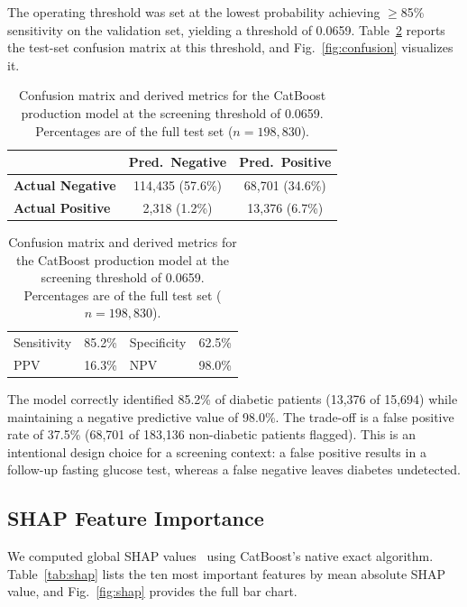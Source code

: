 The operating threshold was set at the lowest probability achieving $\geq$85\% sensitivity on the validation set, yielding a threshold of 0.0659. Table~\ref{tab:confusion} reports the test-set confusion matrix at this threshold, and Fig.~\ref{fig:confusion} visualizes it.

\begin{table}[ht]
\centering
\caption{Confusion matrix and derived metrics for the CatBoost production model at the screening threshold of 0.0659. Percentages are of the full test set ($n = 198{,}830$).}
\label{tab:confusion}
\begin{tabular}{lcc}
\hline
 & \textbf{Pred.\ Negative} & \textbf{Pred.\ Positive} \\
\hline
\textbf{Actual Negative} & 114,435 (57.6\%) & 68,701 (34.6\%) \\
\textbf{Actual Positive} & 2,318 (1.2\%)    & 13,376 (6.7\%)  \\
\hline
\end{tabular}
\vspace{4pt}

\begin{tabular}{lclc}
\hline
Sensitivity & 85.2\% & Specificity & 62.5\% \\
PPV         & 16.3\% & NPV         & 98.0\% \\
\hline
\end{tabular}
\end{table}

The model correctly identified 85.2\% of diabetic patients (13,376 of 15,694) while maintaining a negative predictive value of 98.0\%. The trade-off is a false positive rate of 37.5\% (68,701 of 183,136 non-diabetic patients flagged). This is an intentional design choice for a screening context: a false positive results in a follow-up fasting glucose test, whereas a false negative leaves diabetes undetected.

\subsection{SHAP Feature Importance}
\label{sec:results-shap}

We computed global SHAP values~\cite{Lundberg2017shap} using CatBoost's native exact algorithm. Table~\ref{tab:shap} lists the ten most important features by mean absolute SHAP value, and Fig.~\ref{fig:shap} provides the full bar chart.

